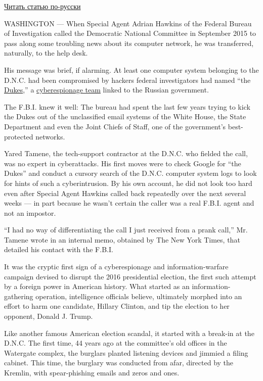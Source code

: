 \href{https://www.nytimes.com/2016/12/21/world/russia-hack-presidential-election.html}{Читать
статью по-русски}

WASHINGTON --- When Special Agent Adrian Hawkins of the Federal Bureau
of Investigation called the Democratic National Committee in September
2015 to pass along some troubling news about its computer network, he
was transferred, naturally, to the help desk.

His message was brief, if alarming. At least one computer system
belonging to the D.N.C. had been compromised by hackers federal
investigators had named ``the
\href{https://labsblog.f-secure.com/2015/09/17/the-dukes-7-years-of-russian-cyber-espionage/}{Dukes},''
a
\href{https://www.nytimes.com/2020/07/16/us/politics/vaccine-hacking-russia.html}{cyberespionage
team} linked to the Russian government.

The F.B.I. knew it well: The bureau had spent the last few years trying
to kick the Dukes out of the unclassified email systems of the White
House, the State Department and even the Joint Chiefs of Staff, one of
the government's best-protected networks.

Yared Tamene, the tech-support contractor at the D.N.C. who fielded the
call, was no expert in cyberattacks. His first moves were to check
Google for ``the Dukes'' and conduct a cursory search of the D.N.C.
computer system logs to look for hints of such a cyberintrusion. By his
own account, he did not look too hard even after Special Agent Hawkins
called back repeatedly over the next several weeks --- in part because
he wasn't certain the caller was a real F.B.I. agent and not an
impostor.

``I had no way of differentiating the call I just received from a prank
call,'' Mr. Tamene wrote in an internal memo, obtained by The New York
Times, that detailed his contact with the F.B.I.

It was the cryptic first sign of a cyberespionage and
information-warfare campaign devised to disrupt the 2016 presidential
election, the first such attempt by a foreign power in American history.
What started as an information-gathering operation, intelligence
officials believe, ultimately morphed into an effort to harm one
candidate, Hillary Clinton, and tip the election to her opponent, Donald
J. Trump.

Like another famous American election scandal, it started with a
break-in at the D.N.C. The first time, 44 years ago at the committee's
old offices in the Watergate complex, the burglars planted listening
devices and jimmied a filing cabinet. This time, the burglary was
conducted from afar, directed by the Kremlin, with spear-phishing emails
and zeros and ones.

